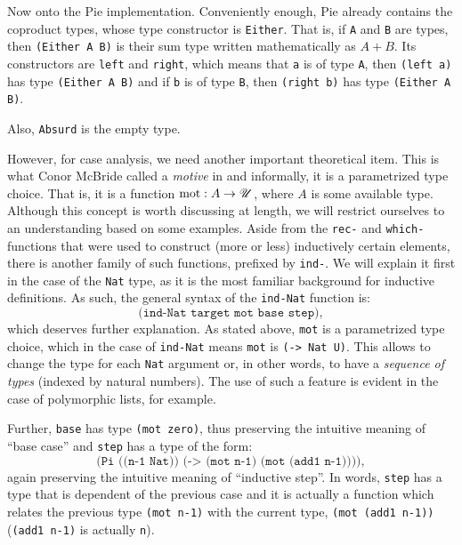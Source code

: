 \vspace{0.3cm}

Now onto the Pie implementation. Conveniently enough, Pie already contains
the coproduct types, whose type constructor is \texttt{Either}. That is,
if \texttt{A} and \texttt{B} are types, then \texttt{(Either A B)} is their
sum type written mathematically as $ A + B $. Its constructors are
\texttt{left} and \texttt{right}, which means that \texttt{a} is of type
\texttt{A}, then \texttt{(left a)} has type \texttt{(Either A B)}
and if \texttt{b} is of type \texttt{B}, then \texttt{(right b)} has
type \texttt{(Either A B)}.

Also, \texttt{Absurd} is the empty type.


However, for case analysis, we need another important theoretical item.
This is what Conor McBride called a \emph{motive} in \cite{motive} and
informally, it is a parametrized type choice. That is, it is a function
$ \mathrm{mot} : A \to \mathscr{U} $, where $ A $ is some available type. Although
this concept is worth discussing at length, we will restrict ourselves to
an understanding based on some examples. Aside from the \texttt{rec-} and
\texttt{which-} functions that were used to construct (more or less)
inductively certain elements, there is another family of such functions,
prefixed by \texttt{ind-}. We will explain it first in the case of the
\texttt{Nat} type, as it is the most familiar background for inductive
definitions. As such, the general syntax of the \texttt{ind-Nat} function is:
\begin{equation}
  \label{eq:ind-nat}
  \texttt{(ind-Nat target mot base step)},
\end{equation}
which deserves further explanation. As stated above, \texttt{mot} is a
parametrized type choice, which in the case of \texttt{ind-Nat} means \texttt{mot}
is \texttt{(-> Nat U)}. This allows to change the type for each \texttt{Nat}
argument or, in other words, to have a \emph{sequence of types} (indexed
by natural numbers). The use of such a feature is evident in the case of
polymorphic lists, for example.

Further, \texttt{base} has type \texttt{(mot zero)}, thus preserving the
intuitive meaning of ``base case'' and \texttt{step} has a type of the form:
\[
  \texttt{(Pi ((n-1 Nat)) (-> (mot n-1) (mot (add1 n-1))))},
\]
again preserving the intuitive meaning of ``inductive step''. In words,
\texttt{step} has a type that is dependent of the previous case and it
is actually a function which relates the previous type \texttt{(mot n-1)}
with the current type, \texttt{(mot (add1 n-1))} (\texttt{(add1 n-1)} is
actually \texttt{n}).

